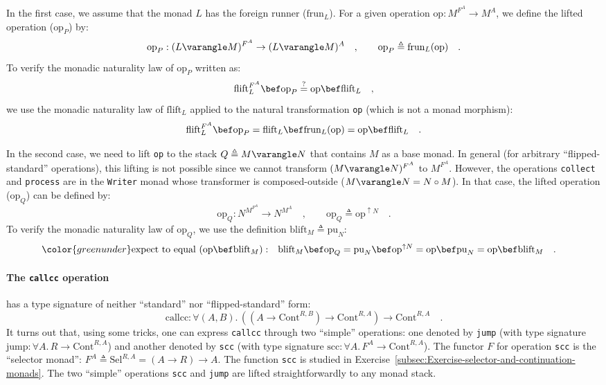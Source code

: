 In the first case, we assume that the monad $L$ has the foreign runner
($\text{frun}_{L}$). For a given operation $\text{op}:M^{F^{A}}\rightarrow M^{A}$,
we define the lifted operation ($\text{op}_{P}$) by:
\[
\text{op}_{P}:(L\varangle M)^{F^{A}}\rightarrow(L\varangle M)^{A}\quad,\quad\quad\text{op}_{P}\triangleq\text{frun}_{L}(\text{op})\quad.
\]
To verify the monadic naturality law of $\text{op}_{P}$ written as:
\[
\text{flift}_{L}^{F^{A}}\bef\text{op}_{P}\overset{?}{=}\text{op}\bef\text{flift}_{L}\quad,
\]
we use the monadic naturality law of $\text{flift}_{L}$ applied to
the natural transformation \lstinline!op! (which is not a monad morphism):
\[
\text{flift}_{L}^{F^{A}}\bef\text{op}_{P}=\text{flift}_{L}\bef\text{frun}_{L}(\text{op})=\text{op}\bef\text{flift}_{L}\quad.
\]

In the second case, we need to lift \lstinline!op! to the stack $Q\triangleq M\varangle N$
that contains $M$ as a base monad. In general (for arbitrary \textsf{``}flipped-standard\textsf{''}
operations), this lifting is not possible since we cannot transform
$(M\varangle N)^{F^{A}}$ to $M^{F^{A}}$. However, the operations
\lstinline!collect! and \lstinline!process! are in the \lstinline!Writer!
monad whose transformer is composed-outside ($M\varangle N=N\circ M$).
In that case, the lifted operation ($\text{op}_{Q}$) can be defined
by:
\[
\text{op}_{Q}:N^{M^{F^{A}}}\rightarrow N^{M^{A}}\quad,\quad\quad\text{op}_{Q}\triangleq\text{op}^{\uparrow N}\quad.
\]
To verify the monadic naturality law of $\text{op}_{Q}$, we use the
definition $\text{blift}_{M}\triangleq\text{pu}_{N}$:
\begin{align*}
{\color{greenunder}\text{expect to equal }(\text{op}\bef\text{blift}_{M}):}\quad & \text{blift}_{M}\bef\text{op}_{Q}=\text{pu}_{N}\bef\text{op}^{\uparrow N}=\text{op}\bef\text{pu}_{N}=\text{op}\bef\text{blift}_{M}\quad.
\end{align*}


\paragraph{The \texttt{callcc} operation}

has a type signature of neither \textsf{``}standard\textsf{''} nor \textsf{``}flipped-standard\textsf{''}
form:
\[
\text{callcc}:\forall(A,B).\,((A\rightarrow\text{Cont}^{R,B})\rightarrow\text{Cont}^{R,A})\rightarrow\text{Cont}^{R,A}\quad.
\]
It turns out that, using some tricks, one can express \lstinline!callcc!
through two \textsf{``}simple\textsf{''} operations: one denoted by \lstinline!jump!
(with type signature $\text{jump}:\forall A.\,R\rightarrow\text{Cont}^{R,A}$)
and another denoted by \lstinline!scc! (with type signature $\text{scc}:\forall A.\,F^{A}\rightarrow\text{Cont}^{R,A}$).
The functor $F$ for operation \lstinline!scc! is the \textsf{``}selector
monad\textsf{''}: $F^{A}\triangleq\text{Sel}^{R,A}=(A\rightarrow R)\rightarrow A$.
The function \lstinline!scc! is studied in Exercise~\ref{subsec:Exercise-selector-and-continuation-monads}.
The two \textsf{``}simple\textsf{''} operations \lstinline!scc! and \lstinline!jump!
are lifted straightforwardly to any monad stack. 

